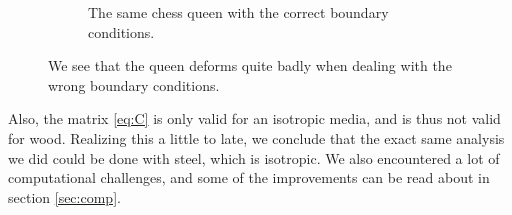 \begin{figure}[ht]
\begin{subfigure}[b]{0.45 \textwidth}
                \caption{The same chess queen with the correct boundary conditions.}
        \end{subfigure}
        \caption{We see that the queen deforms quite badly when dealing with the wrong boundary conditions. }
        \label{fig:queens}
\end{figure}


Also, the matrix \eqref{eq:C} is only valid for an isotropic media, and is thus not valid for wood. Realizing this a little to late, we conclude that the exact same analysis we did could be done with steel, which is isotropic. We also encountered a lot of computational challenges, and some of the improvements can be read about in section \ref{sec:comp}.
